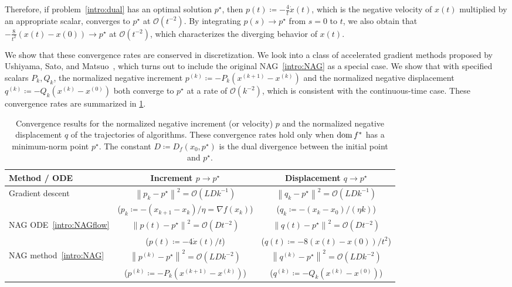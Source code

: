 \documentclass[11pt,a4paper]{article}
\theoremstyle{definition}
\theoremstyle{plain}
\newcommand{\dom}{\mathop{\rm dom}}
\begin{document}
Therefore, if problem~\eqref{intro:dual} has an optimal solution $p^\star$, then $p(t) \coloneqq -\frac{4}{t}\dot x(t)$, which is the negative velocity of $x(t)$ multiplied by an appropriate scalar, converges to $p^\star$ at $\mathcal{O}(t^{-2})$.
By integrating $p(s) \to p^\star$ from $s = 0$ to $t$, we also obtain that $-\frac8{t^2}(x(t) - x(0)) \to p^\star$ at $\mathcal{O}(t^{-2})$, which characterizes the diverging behavior of $x(t)$.

We show that these convergence rates are conserved in discretization.
We look into a class of accelerated gradient methods proposed by Ushiyama, Sato, and Matsuo~\cite{USM2023}, which turns out to include the original NAG~\eqref{intro:NAG} as a special case.
We show that with specified scalars $P_k, Q_k$, the normalized negative increment $p^{(k)} \coloneqq -P_k(x^{(k + 1)} - x^{(k)})$ and the normalized negative displacement $q^{(k)} \coloneqq -Q_k(x^{(k)} - x^{(0)})$ both converge to $p^\star$ at a rate of $\mathcal{O}(k^{-2})$, which is consistent with the continuous-time case.
These convergence rates are summarized in \cref{tab:intro}.

\begin{table}[htbp]
    \center
    \caption{Convergence results for the normalized negative increment (or velocity) $p$ and the normalized negative displacement $q$ of the trajectories of algorithms.
    These convergence rates hold only when $\dom f^\ast$ has a minimum-norm point $p^\star$.
    The constant $D \coloneqq D_f(x_0, p^\star)$ is the dual divergence between the initial point and $p^\star$.}
    \label{tab:intro}
	\begin{tabular}{lcc}\toprule
    	Method / ODE & Increment $p \to p^\star$ & Displacement $q \to p^\star$ \\\midrule\midrule
        \multirow{2}{*}{Gradient descent} & $\left\|p_k - p^\star\right\|^2 = \mathcal{O}(LDk^{-1})$ & $\left\|q_k - p^\star\right\|^2 = \mathcal{O}(LDk^{-1})$ \\
        & ($p_k \coloneqq -(x_{k + 1} - x_k)/\eta = \nabla f(x_k)$) & ($q_k \coloneqq -(x_k - x_0)/(\eta k)$) \\\midrule
        \multirow{2}{*}{NAG ODE~\eqref{intro:NAGflow}} & $\left\|p(t) - p^\star\right\|^2 = \mathcal{O}(Dt^{-2})$ & $\left\|q(t) - p^\star\right\|^2 = \mathcal{O}(Dt^{-2})$ \\
        & ($p(t) \coloneqq -4\dot x(t)/t$) & ($q(t) \coloneqq -8(x(t) - x(0))/t^2$) \\\midrule
        \multirow{2}{*}{NAG method~\eqref{intro:NAG}} & $\left\|p^{(k)} - p^\star\right\|^2 = \mathcal{O}(LDk^{-2})$ & $\left\|q^{(k)} - p^\star\right\|^2 = \mathcal{O}(LDk^{-2})$ \\
        & ($p^{(k)} \coloneqq -P_k\left(x^{(k + 1)} - x^{(k)}\right)$) & ($q^{(k)} \coloneqq -Q_k\left(x^{(k)} - x^{(0)}\right)$) \\\bottomrule
    \end{tabular}
\end{table}
\end{document}
